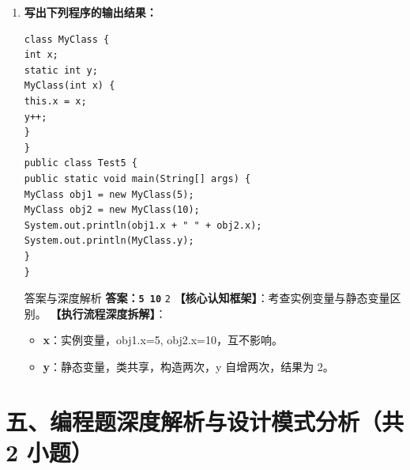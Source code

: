 \documentclass[12pt, a4paper]{ctexart}
\newcommand{\code}[1]{\texttt{#1}}
\begin{document}
\begin{enumerate}[label=\textbf{\arabic*.}, leftmargin=*, itemsep=1.5em]
\item \textbf{写出下列程序的输出结果：}
\begin{lstlisting}[style=JavaExam]
class MyClass {
int x;
static int y;
MyClass(int x) {
this.x = x;
y++;
}
}
public class Test5 {
public static void main(String[] args) {
MyClass obj1 = new MyClass(5);
MyClass obj2 = new MyClass(10);
System.out.println(obj1.x + " " + obj2.x);
System.out.println(MyClass.y);
}
}
\end{lstlisting}
\begin{bluebox}{答案与深度解析}
\textbf{答案：\code{5 10}} \newline \code{2}
\textbf{【核心认知框架】}：考查实例变量与静态变量区别。
\textbf{【执行流程深度拆解】}：
\begin{itemize}[leftmargin=*, nosep]
    \item \textbf{x}：实例变量，obj1.x=5, obj2.x=10，互不影响。
    \item \textbf{y}：静态变量，类共享，构造两次，y 自增两次，结果为 2。
\end{itemize}
\end{bluebox}
\end{enumerate}

\section*{五、编程题深度解析与设计模式分析（共 2 小题）}
\end{document}
